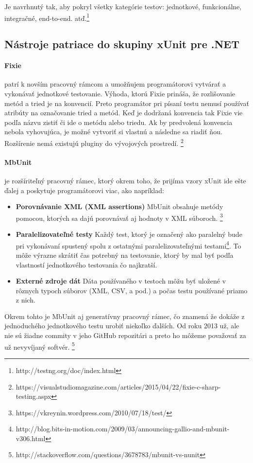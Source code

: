 \documentclass[11pt,twoside,slovak,a4paper]{article}
\begin{document}
	Je navrhnutý tak, aby pokryl všetky kategórie testov: jednotkové, funkcionálne, integračné, end-to-end. atď.\footnote{http://testng.org/doc/index.html}

		\subsection{Nástroje patriace do skupiny xUnit pre .NET}
			
			\paragraph{Fixie} patrí k novším pracovný rámcom a umožňujem programátorovi vytvárať a vykonávať jednotkové testovanie. Výhoda, ktorú Fixie prináša, že rozlišovanie metód a tried je na konvencií. Preto programátor pri písaní testu nemusí používať atribúty na označovanie tried a metód. Keď je dodržaná konvencia tak Fixie vie podľa názvu zistiť či ide o metódu alebo triedu. Ak by predvolená konvencia nebola vyhovujúca, je možné vytvoriť si vlastnú a následne sa riadiť ňou. Rozšírenie nemá existujú pluginy do vývojových prostredí.  \footnote{https://visualstudiomagazine.com/articles/2015/04/22/fixie-c-sharp-testing.aspx}
			
			\paragraph{MbUnit} je rozšíriteľný pracovný rámec, ktorý okrem toho, že prijíma vzory xUnit ide ešte ďalej a poskytuje programátorovi viac, ako napríklad:
			\begin{itemize}
				\item \textbf{Porovnávanie XML (XML assertions)} MbUnit obsahuje metódy pomocou, ktorých sa dajú porovnávať aj hodnoty v XML súboroch. \footnote{https://vkreynin.wordpress.com/2010/07/18/test/}
				\item \textbf{Paralelizovateľné testy} Každý test, ktorý je označený ako paralelný bude pri vykonávaní spustený spolu z ostatnými paralelizovateľnými testami\footnote{http://blog.bits-in-motion.com/2009/03/announcing-gallio-and-mbunit-v306.html}. To môže výrazne skrátiť čas potrebný na testovanie, ktorý by mal byť podľa vlastností jednotkového testovania čo najkratší. 
				\item \textbf{Externé zdroje dát} Dáta používaného v testoch môžu byť uložené v rôznych typoch súborov (XML, CSV, a pod.) a počas testu používané priamo z nich.
			\end{itemize}
			Okrem tohto je MbUnit aj generatívny pracovný rámec, čo znamená že dokáže z jednoduchého jednotkového testu urobiť niekoľko ďalších. Od roku 2013 už, ale nie sú žiadne commity v jeho GitHub repozitári a preto ho môžeme považovať za už nevyvíjaný softvér. \footnote{http://stackoverflow.com/questions/3678783/mbunit-vs-nunit}
			
\end{document}
